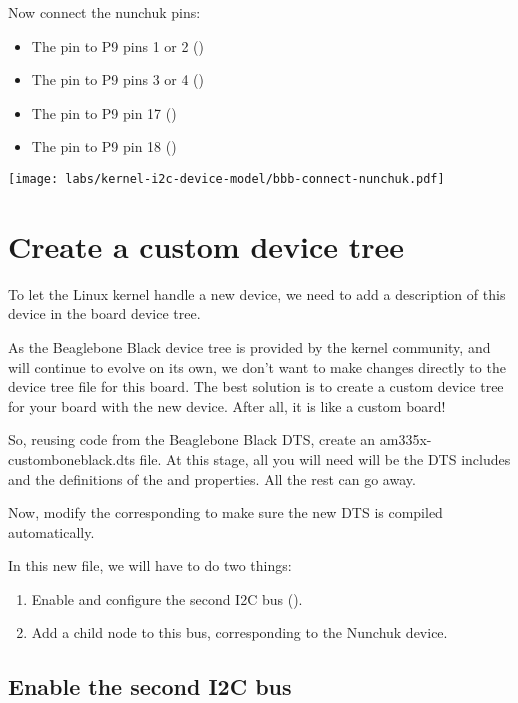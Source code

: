 Now connect the nunchuk pins:
\begin{itemize}
\item The  pin to P9 pins 1 or 2 ()
\item The  pin to P9 pins 3 or 4 ()
\item The  pin to P9 pin 17 ()
\item The  pin to P9 pin 18 ()
\end{itemize}

\begin{center}
\texttt{[image: labs/kernel-i2c-device-model/bbb-connect-nunchuk.pdf]}
\end{center}

\section{Create a custom device tree}

To let the Linux kernel handle a new device, we need to add a
description of this device in the board device tree.

As the Beaglebone Black device tree is provided by the kernel community,
and will continue to evolve on its own, we don't want to make changes
directly to the device tree file for this board. The best solution is
to create a custom device tree for your board with the new device.
After all, it is like a custom board!

So, reusing code from the Beaglebone Black DTS, create an
am335x-customboneblack.dts file. At this stage, all you will need
will be the DTS includes and the definitions of the 
and  properties. All the rest can go away.

Now, modify the corresponding  to make sure the
new DTS is compiled automatically.

In this new file, we will have to do two things:

\begin{enumerate}
\item Enable and configure the second I2C bus ().
\item Add a child node to this bus, corresponding to the Nunchuk device.
\end{enumerate}

\subsection{Enable the second I2C bus}

